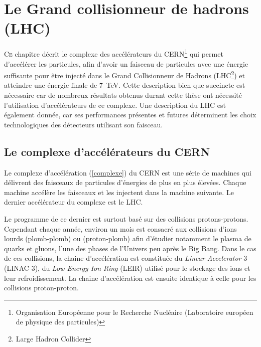 \chapter{Le Grand collisionneur de hadrons (LHC)}
\renewcommand\chapterillustration{LHC/lhc}
\ThisULCornerWallPaper{1}{\chapterillustration}
\minitoc
\lettrine[lines=4, slope=-0.5em]{C}{e} chapitre décrit le complexe des accélérateurs du CERN\footnote{Organisation Européenne pour le Recherche Nucléaire (Laboratoire européen de physique des particules)} qui permet d'accélérer les particules, afin d'avoir un faisceau de particules avec une énergie suffisante pour être injecté dans le Grand Collisionneur de Hadrons (LHC\footnote{Large Hadron Collider}) et atteindre une énergie finale de \SI{7}{\tera\eV}. Cette description bien que succincte est nécessaire car de nombreux résultats obtenus durant cette thèse ont nécessité l'utilisation d'accélérateurs de ce complexe. Une description du LHC est également donnée, car ses performances présentes et futures déterminent les choix technologiques des détecteurs utilisant son faisceau.

\section{Le complexe d'accélérateurs du CERN}

Le complexe d'accélération (\ref{complexe}) du CERN est une série de machines qui délivrent des faisceaux de particules d'énergies de plus en plus élevées. Chaque machine accélère les faisceaux et les injectent dans la machine suivante. Le dernier accélérateur du complexe est le LHC.

Le programme de ce dernier est surtout basé sur des collisions protons-protons. Cependant chaque année, environ un mois est consacré aux collisions d'ions lourds (plomb-plomb) ou (proton-plomb) afin d'étudier notamment le plasma de quarks et gluons, l'une des phases de l'Univers peu après le Big Bang. Dans le cas de ces collisions, la chaine d'accélération est constituée du \textit{Linear Accelerator} \num{3} (LINAC \num{3}), du \textit{Low Energy Ion Ring} (LEIR) utilisé pour le stockage des ions et leur refroidissement. La chaine d'accélération est ensuite identique à celle pour les collisions proton-proton.

